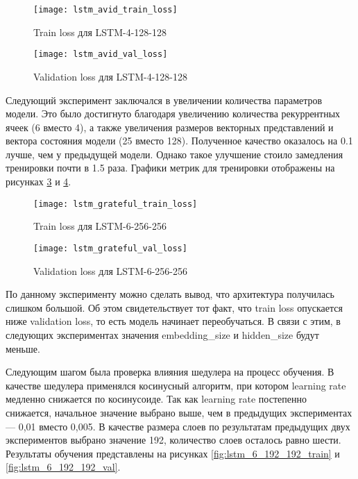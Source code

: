 \begin{figure}[ht]
	\centering
	\texttt{[image: lstm\_avid\_train\_loss]}  
	\caption{ Train loss для LSTM-4-128-128 }
	\label{fig:lstm_4_128_128_train}
\end{figure}

\begin{figure}[ht]
	\centering
	\texttt{[image: lstm\_avid\_val\_loss]}  
	\caption{ Validation loss для LSTM-4-128-128 }
	\label{fig:lstm_4_128_128_val}
\end{figure}

Следующий эксперимент заключался в увеличении количества параметров модели. Это было достигнуто благодаря увеличению количества рекуррентных ячеек (6 вместо 4), а также увеличения размеров векторных представлений и вектора состояния модели (25 вместо 128). Полученное качество оказалось на 0.1 лучше, чем у предыдущей модели. Однако такое улучшение стоило замедления тренировки почти в 1.5 раза. Графики метрик для тренировки отображены на рисунках \ref{fig:lstm_6_256_256_train} и \ref{fig:lstm_6_256_256_val}.

\begin{figure}[ht]
	\centering
	\texttt{[image: lstm\_grateful\_train\_loss]}  
	\caption{ Train loss для LSTM-6-256-256 }
	\label{fig:lstm_6_256_256_train}
\end{figure}

\begin{figure}[ht]
	\centering
	\texttt{[image: lstm\_grateful\_val\_loss]}  
	\caption{ Validation loss для LSTM-6-256-256 }
	\label{fig:lstm_6_256_256_val}
\end{figure}

По данному эксперименту можно сделать вывод, что архитектура получилась слишком большой. Об этом свидетельствует тот факт, что train loss опускается ниже validation loss, то есть модель начинает переобучаться. В связи с этим, в следующих экспериментах значения embedding\_size и hidden\_size будут меньше.

Следующим шагом была проверка влияния шедулера на процесс обучения. В качестве шедулера применялся косинусный алгоритм, при котором learning rate медленно снижается по косинусоиде. Так как learning rate постепенно снижается, начальное значение выбрано выше, чем в предыдущих экспериментах --- 0,01 вместо 0,005. В качестве размера слоев по результатам предыдущих двух экспериментов выбрано значение 192, количество слоев осталось равно шести. Результаты обучения представлены на рисунках \ref{fig:lstm_6_192_192_train} и \ref{fig:lstm_6_192_192_val}.

